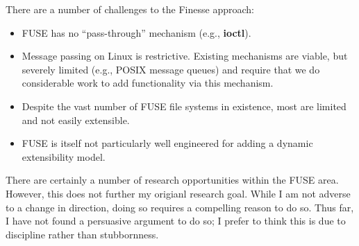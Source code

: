 \documentclass[letterpaper,twocolumn,10pt]{article}
\begin{document}
There are a number of challenges to the Finesse approach:

\begin {comment}

Sasha's comment:

You begin discussing drawbacks of Finesse, but you haven’t given the reader enough background about it. If
the proposal is not about Finesse, why include it? If there is a reason, state it, so the reader knows why
he or she is reading about it.

\end{comment}

\begin{itemize}
    \item FUSE has no ``pass-through'' mechanism (e.g., \textbf{ioctl}).
    \item Message passing on Linux is restrictive.  Existing mechanisms are viable, but severely limited
    (e.g., POSIX message queues) and require that we do considerable work to add functionality via this mechanism.
    \item Despite the vast number of FUSE file systems in existence, most are limited and not easily extensible.
    \item FUSE is itself not particularly well engineered for adding a dynamic extensibility model.
\end{itemize}

There are certainly a number of research opportunities within the FUSE area.  However, this does not further
my origianl research goal.  While I am not adverse to a change in direction, doing so requires a compelling
reason to do so.  Thus far, I have not found a persuasive argument to do so; I prefer to think this is due to
discipline rather than stubbornness.

\end{document}
